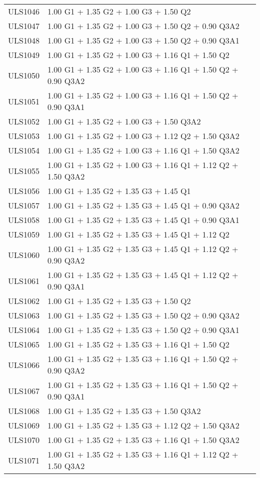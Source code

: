 \begin{center}
\begin{small}
\begin{longtable}{|l|p{10cm}|}
ULS1046 & 1.00 G1 + 1.35 G2 + 1.00 G3 + 1.50 Q2\\
ULS1047 & 1.00 G1 + 1.35 G2 + 1.00 G3 + 1.50 Q2 + 0.90 Q3A2\\
ULS1048 & 1.00 G1 + 1.35 G2 + 1.00 G3 + 1.50 Q2 + 0.90 Q3A1\\
ULS1049 & 1.00 G1 + 1.35 G2 + 1.00 G3 + 1.16 Q1 + 1.50 Q2\\
ULS1050 & 1.00 G1 + 1.35 G2 + 1.00 G3 + 1.16 Q1 + 1.50 Q2 + 0.90 Q3A2\\
ULS1051 & 1.00 G1 + 1.35 G2 + 1.00 G3 + 1.16 Q1 + 1.50 Q2 + 0.90 Q3A1\\
ULS1052 & 1.00 G1 + 1.35 G2 + 1.00 G3 + 1.50 Q3A2\\
ULS1053 & 1.00 G1 + 1.35 G2 + 1.00 G3 + 1.12 Q2 + 1.50 Q3A2\\
ULS1054 & 1.00 G1 + 1.35 G2 + 1.00 G3 + 1.16 Q1 + 1.50 Q3A2\\
ULS1055 & 1.00 G1 + 1.35 G2 + 1.00 G3 + 1.16 Q1 + 1.12 Q2 + 1.50 Q3A2\\
ULS1056 & 1.00 G1 + 1.35 G2 + 1.35 G3 + 1.45 Q1\\
ULS1057 & 1.00 G1 + 1.35 G2 + 1.35 G3 + 1.45 Q1 + 0.90 Q3A2\\
ULS1058 & 1.00 G1 + 1.35 G2 + 1.35 G3 + 1.45 Q1 + 0.90 Q3A1\\
ULS1059 & 1.00 G1 + 1.35 G2 + 1.35 G3 + 1.45 Q1 + 1.12 Q2\\
ULS1060 & 1.00 G1 + 1.35 G2 + 1.35 G3 + 1.45 Q1 + 1.12 Q2 + 0.90 Q3A2\\
ULS1061 & 1.00 G1 + 1.35 G2 + 1.35 G3 + 1.45 Q1 + 1.12 Q2 + 0.90 Q3A1\\
ULS1062 & 1.00 G1 + 1.35 G2 + 1.35 G3 + 1.50 Q2\\
ULS1063 & 1.00 G1 + 1.35 G2 + 1.35 G3 + 1.50 Q2 + 0.90 Q3A2\\
ULS1064 & 1.00 G1 + 1.35 G2 + 1.35 G3 + 1.50 Q2 + 0.90 Q3A1\\
ULS1065 & 1.00 G1 + 1.35 G2 + 1.35 G3 + 1.16 Q1 + 1.50 Q2\\
ULS1066 & 1.00 G1 + 1.35 G2 + 1.35 G3 + 1.16 Q1 + 1.50 Q2 + 0.90 Q3A2\\
ULS1067 & 1.00 G1 + 1.35 G2 + 1.35 G3 + 1.16 Q1 + 1.50 Q2 + 0.90 Q3A1\\
ULS1068 & 1.00 G1 + 1.35 G2 + 1.35 G3 + 1.50 Q3A2\\
ULS1069 & 1.00 G1 + 1.35 G2 + 1.35 G3 + 1.12 Q2 + 1.50 Q3A2\\
ULS1070 & 1.00 G1 + 1.35 G2 + 1.35 G3 + 1.16 Q1 + 1.50 Q3A2\\
ULS1071 & 1.00 G1 + 1.35 G2 + 1.35 G3 + 1.16 Q1 + 1.12 Q2 + 1.50 Q3A2\\

\end{longtable}
\end{small}
\end{center}
